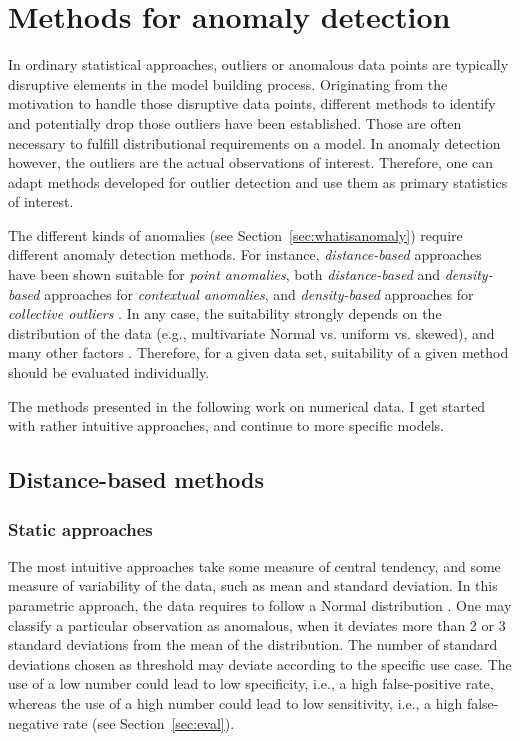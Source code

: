 \documentclass[conference]{IEEEtran}
\begin{document}
\section{Methods for anomaly detection}

In ordinary statistical approaches, outliers or anomalous data points are typically disruptive elements in the model building process. Originating from the motivation to handle those disruptive data points, different methods to identify and potentially drop those outliers have been established. Those are often necessary to fulfill distributional requirements on a model. In anomaly detection however, the outliers are the actual observations of interest. Therefore, one can adapt methods developed for outlier detection and use them as primary statistics of interest.

The different kinds of anomalies (see Section~\ref{sec:whatisanomaly}) require different anomaly detection methods. For instance, \emph{distance-based} approaches have been shown suitable for \emph{point anomalies}, both  \emph{distance-based} and \emph{density-based} approaches for \emph{contextual anomalies}, and \emph{density-based} approaches for \emph{collective outliers} \cite{gogoi2011survey}. In any case, the suitability strongly depends on the distribution of the data (e.g., multivariate Normal vs. uniform vs. skewed), and many other factors \cite{gogoi2011survey}. Therefore, for a given data set, suitability of a given method should be evaluated individually. 

The methods presented in the following work on numerical data. I get started with rather intuitive approaches, and continue to more specific models. 


\subsection{Distance-based methods}

\subsubsection{Static approaches}

The most intuitive approaches take some measure of central tendency, and some measure of variability of the data, such as mean and standard deviation. In this parametric approach, the data requires to follow a Normal distribution \cite{howell1998statistical}. One may classify a particular observation as anomalous, when it deviates more than 2 or 3 standard deviations from the mean of the distribution. The number of standard deviations chosen as threshold may deviate according to the specific use case. The use of a low number could lead to low specificity, i.e., a high false-positive rate, whereas the use of a high number could lead to low sensitivity, i.e., a high false-negative rate (see Section~\ref{sec:eval}).
\end{document}
